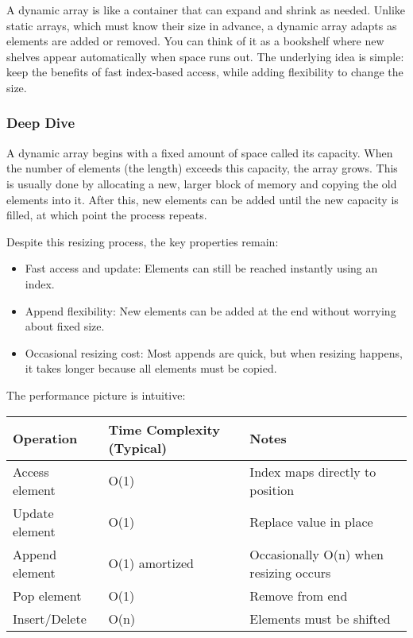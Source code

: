 \documentclass[
  letterpaper,
  DIV=11,
  numbers=noendperiod]{scrreprt}
\providecommand{\tightlist}{%
  \setlength{\itemsep}{0pt}\setlength{\parskip}{0pt}}
\begin{document}
A dynamic array is like a container that can expand and shrink as
needed. Unlike static arrays, which must know their size in advance, a
dynamic array adapts as elements are added or removed. You can think of
it as a bookshelf where new shelves appear automatically when space runs
out. The underlying idea is simple: keep the benefits of fast
index-based access, while adding flexibility to change the size.

\subsubsection{Deep Dive}\label{deep-dive-3}

A dynamic array begins with a fixed amount of space called its capacity.
When the number of elements (the length) exceeds this capacity, the
array grows. This is usually done by allocating a new, larger block of
memory and copying the old elements into it. After this, new elements
can be added until the new capacity is filled, at which point the
process repeats.

Despite this resizing process, the key properties remain:

\begin{itemize}
\tightlist
\item
  Fast access and update: Elements can still be reached instantly using
  an index.
\item
  Append flexibility: New elements can be added at the end without
  worrying about fixed size.
\item
  Occasional resizing cost: Most appends are quick, but when resizing
  happens, it takes longer because all elements must be copied.
\end{itemize}

The performance picture is intuitive:

\begin{longtable}[]{@{}
  >{\raggedright\arraybackslash}p{}
  >{\raggedright\arraybackslash}p{}
  >{\raggedright\arraybackslash}p{}@{}}
\toprule\noalign{}
\begin{minipage}[b]{\linewidth}\raggedright
Operation
\end{minipage} & \begin{minipage}[b]{\linewidth}\raggedright
Time Complexity (Typical)
\end{minipage} & \begin{minipage}[b]{\linewidth}\raggedright
Notes
\end{minipage} \\
\midrule\noalign{}
\endhead
\bottomrule\noalign{}
\endlastfoot
Access element & O(1) & Index maps directly to position \\
Update element & O(1) & Replace value in place \\
Append element & O(1) amortized & Occasionally O(n) when resizing
occurs \\
Pop element & O(1) & Remove from end \\
Insert/Delete & O(n) & Elements must be shifted \\
\end{longtable}
\end{document}
